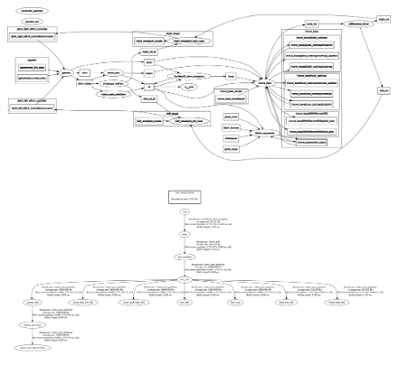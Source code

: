 \documentclass[12]{article}
\begin{document}
\begin{landscape}
\newpage
\begin{figure}
    \centering
    \includegraphics[width=\columnwidth]{images/rosgraph.png}
\end{figure}
\end{landscape}
\begin{landscape}
\newpage
\begin{figure}
    \centering
    \includegraphics[width=\columnwidth]{images/frames-1.png}
\end{figure}

\end{landscape}
\newpage
\end{document}
